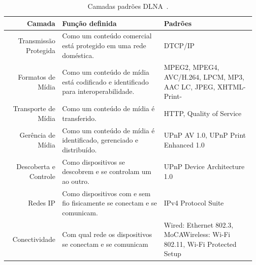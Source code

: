 \begin{table}
	\caption{Camadas padrões DLNA~\cite{dlnahdvideostreaming}.}
	\begin{center}
		\begin{tabular}{rp{5cm}p{5cm}}
		\hline
		\textbf{Camada} & \textbf{Função definida} & \textbf{Padrões}				\\
		\hline
		Transmissão Protegida & Como um conteúdo comercial está protegido em uma rede doméstica. & DTCP/IP \\
		\hline
		Formatos de Mídia & Como um conteúdo de mídia está codificado e identificado para interoperabilidade. & MPEG2, MPEG4, AVC/H.264, LPCM, MP3, AAC LC, JPEG, XHTML-Print- \\
		\hline
		Transporte de Mídia & Como um conteúdo de mídia é transferido. & HTTP, Quality of Service \\
		\hline
		Gerência de Mídia & Como um conteúdo de mídia é identificado, gerenciado e distribuído. & UPnP AV 1.0, UPnP Print Enhanced 1.0 \\
		\hline
		Descoberta e Controle & Como dispositivos se descobrem e se controlam um ao outro. & UPnP Device Architecture 1.0 \\
		\hline
		Redes IP & Como dispositivos com e sem fio fisicamente se conectam e se comunicam. & IPv4 Protocol Suite \\
		\hline
		Conectividade & Com qual rede os dispositivos se conectam e se comunicam& Wired: Ethernet 802.3, MoCAWireless: Wi-Fi 802.11, Wi-Fi Protected Setup \\
		\hline
		\end{tabular}
	\end{center}
	\label{tab:camadaspadroes_dlna}
\end{table}

